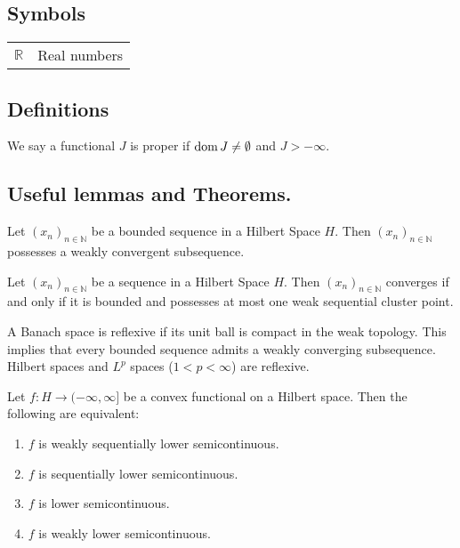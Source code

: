 \subsection{Symbols}
\begin{tabular}{ll}
	$\mathbb{R}$ & Real numbers \\
	
\end{tabular}

\subsection{Definitions}
\begin{definition}
	We say a functional $J$ is proper if $\mathrm{dom\,} J \neq \emptyset$ and $J>-\infty$.
\end{definition}
\subsection{Useful lemmas and Theorems.}
\begin{lemma}
	Let $(x_n)_{n \in \mathbb{N}}$ be a bounded sequence in a Hilbert Space $H$. Then $(x_n)_{n \in \mathbb{N}}$ possesses a weakly convergent subsequence.
\end{lemma}

\begin{lemma}
Let $(x_n)_{n \in \mathbb{N}}$ be a sequence in a Hilbert Space $H$. Then $(x_n)_{n \in \mathbb{N}}$ converges if and only if it is bounded and possesses at most one weak sequential cluster point.
\end{lemma}
\begin{fact}
	A Banach space is reflexive if its unit ball is compact in the weak topology. This implies that every bounded sequence admits a weakly converging subsequence. Hilbert spaces and $L^p$ spaces ($1<p<\infty$) are reflexive.
\end{fact}
\begin{theorem} 
	Let $f: H \rightarrow (−\infty, \infty]$ be a convex functional on a Hilbert space. Then the following are equivalent:
	\begin{enumerate}[label=(\roman{*})]
\item 	$f$ is weakly sequentially lower semicontinuous.
\item 	$f$ is sequentially lower semicontinuous.
\item 	$f$ is lower semicontinuous.
\item 	$f$ is weakly lower semicontinuous.
	\end{enumerate}
\end{theorem}

